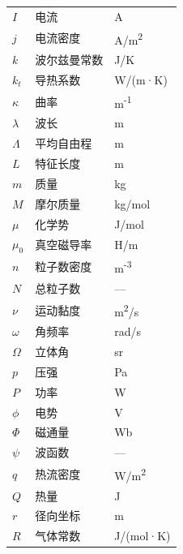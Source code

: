 \begin{longtable}{@{}lll@{}}
    $I$             & 电流                      & A \\
    $j$             & 电流密度                  & A/m\textsuperscript{2} \\
    $k$             & 波尔兹曼常数              & J/K \\
    $k_t$           & 导热系数                  & W/(m·K) \\
    $\kappa$        & 曲率                      & m\textsuperscript{-1} \\
    $\lambda$       & 波长                      & m \\
    $\Lambda$       & 平均自由程                & m \\
    $L$             & 特征长度                  & m \\
    $m$             & 质量                      & kg \\
    $M$             & 摩尔质量                  & kg/mol \\
    $\mu$           & 化学势                    & J/mol \\
    $\mu_0$         & 真空磁导率                & H/m \\
    $n$             & 粒子数密度                & m\textsuperscript{-3} \\
    $N$             & 总粒子数                  & — \\
    $\nu$           & 运动黏度                  & m\textsuperscript{2}/s \\
    $\omega$        & 角频率                    & rad/s \\
    $\Omega$        & 立体角                    & sr \\
    $p$             & 压强                      & Pa \\
    $P$             & 功率                      & W \\
    $\phi$          & 电势                      & V \\
    $\Phi$          & 磁通量                    & Wb \\
    $\psi$          & 波函数                    & — \\
    $q$             & 热流密度                  & W/m\textsuperscript{2} \\
    $Q$             & 热量                      & J \\
    $r$             & 径向坐标                  & m \\
    $R$             & 气体常数                  & J/(mol·K) \\

\end{longtable}
